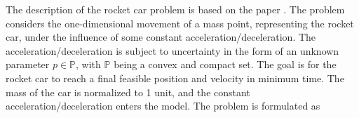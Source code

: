\documentclass  [
  paper    = a4,
  BCOR     = 10mm,
  twoside,
  fontsize = 12pt,
  fleqn,
  toc      = bibnumbered,
  toc      = listofnumbered,
  numbers  = noendperiod,
  headings = normal,
  listof   = leveldown,
  version  = 3.03
]                                       {scrreprt}
\newcommand{\<}{\langle}
\renewcommand{\>}{\rangle}
\begin{document}
The description of the rocket car problem is based on the paper \cite{MatSch22}. The problem considers the one-dimensional movement of a mass point, representing the rocket car, under the influence of some constant acceleration/deceleration. The acceleration/deceleration is subject to uncertainty in the form of an unknown parameter $p \in \mathbb{P}$, with $\mathbb{P}$ being a convex and compact set. The goal is for the rocket car to reach a final feasible position and velocity in minimum time. The mass of the car is normalized to 1 unit, and the constant acceleration/deceleration enters the model. The problem is formulated as 



\end{document}
